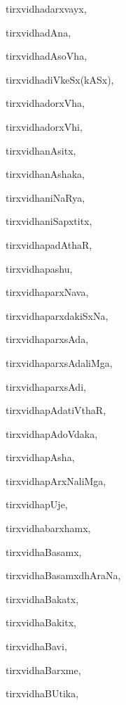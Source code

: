 \begin{multicols}{2}
{tirxvidhadarxvayx}, \pageref{tirxvidhadarxvayx}

{tirxvidhadAna}, \pageref{tirxvidhadAna}

{tirxvidhadAsoVha}, \pageref{tirxvidhadAsoVha}

{tirxvidhadiVkeSx(kASx)}, \pageref{tirxvidhadiVkeSxkASx}

{tirxvidhadorxVha}, \pageref{tirxvidhadorxVha}

{tirxvidhadorxVhi}, \pageref{tirxvidhadorxVhi}

{tirxvidhanAsitx}, \pageref{tirxvidhanAsitx}

{tirxvidhanAshaka}, \pageref{tirxvidhanAshaka}

{tirxvidhaniNaRya}, \pageref{tirxvidhaniNaRya}

{tirxvidhaniSapxtitx}, \pageref{tirxvidhaniSapxtitx}

{tirxvidhapadAthaR}, \pageref{tirxvidhapadAthaR}

{tirxvidhapashu}, \pageref{tirxvidhapashu}

{tirxvidhaparxNava}, \pageref{tirxvidhaparxNava}

{tirxvidhaparxdakiSxNa}, \pageref{tirxvidhaparxdakiSxNa}

{tirxvidhaparxsAda}, \pageref{tirxvidhaparxsAda}

{tirxvidhaparxsAdaliMga}, \pageref{tirxvidhaparxsAdaliMga}

{tirxvidhaparxsAdi}, \pageref{tirxvidhaparxsAdi}

{tirxvidhapAdatiVthaR}, \pageref{tirxvidhapAdatiVthaR}

{tirxvidhapAdoVdaka}, \pageref{tirxvidhapAdoVdaka}

{tirxvidhapAsha}, \pageref{tirxvidhapAsha}

{tirxvidhapArxNaliMga}, \pageref{tirxvidhapArxNaliMga}

{tirxvidhapUje}, \pageref{tirxvidhapUje}

{tirxvidhabarxhamx}, \pageref{tirxvidhabarxhamx}

{tirxvidhaBasamx}, \pageref{tirxvidhaBasamx}

{tirxvidhaBasamxdhAraNa}, \pageref{tirxvidhaBasamxdhAraNa}

{tirxvidhaBakatx}, \pageref{tirxvidhaBakatx}

{tirxvidhaBakitx}, \pageref{tirxvidhaBakitx}

{tirxvidhaBavi}, \pageref{tirxvidhaBavi}

{tirxvidhaBarxme}, \pageref{tirxvidhaBarxme}

{tirxvidhaBUtika}, \pageref{tirxvidhaBUtika}


\end{multicols}
